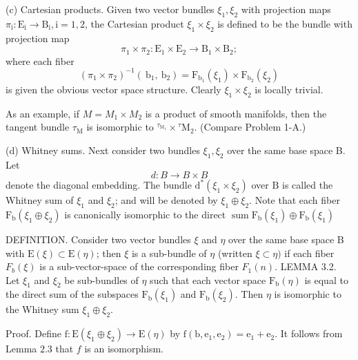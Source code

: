 \documentclass[10pt]{article}
\begin{document}
(c) Cartesian products. Given two vector bundles $\xi_{1}, \xi_{2}$ with projection maps $\pi_{\mathrm{i}}: \mathrm{E}_{\mathrm{i}} \rightarrow \mathrm{B}_{\mathrm{i}}, \mathrm{i}=1,2$, the Cartesian product $\xi_{1} \times \xi_{2}$ is defined to be the bundle with projection map
$$
\pi_{1} \times \pi_{2}: \mathrm{E}_{1} \times \mathrm{E}_{2} \rightarrow \mathrm{B}_{1} \times \mathrm{B}_{2} ;
$$
where each fiber
$$
\left(\pi_{1} \times \pi_{2}\right)^{-1}\left(\mathrm{~b}_{1}, \mathrm{~b}_{2}\right)=\mathrm{F}_{\mathrm{b}_{1}}\left(\xi_{1}\right) \times \mathrm{F}_{\mathrm{b}_{2}}\left(\xi_{2}\right)
$$
is given the obvious vector space structure. Clearly $\xi_{1} \times \xi_{2}$ is locally trivial.

As an example, if $M=M_{1} \times M_{2}$ is a product of smooth manifolds, then the tangent bundle $\tau_{\mathrm{M}}$ is isomorphic to ${ }^{\tau_{\mathrm{M}_{1}}} \times{ }^{\tau} \mathrm{M}_{2}$. (Compare Problem 1-A.)

(d) Whitney sums. Next consider two bundles $\xi_{1}, \xi_{2}$ over the same base space B. Let
$$
d: B \rightarrow B \times B
$$
denote the diagonal embedding. The bundle $\mathrm{d}^{*}\left(\xi_{1} \times \xi_{2}\right)$ over $\mathrm{B}$ is called the Whitney sum of $\xi_{1}$ and $\xi_{2}$; and will be denoted by $\xi_{1} \oplus \xi_{2}$. Note that each fiber $\mathrm{F}_{\mathrm{b}}\left(\xi_{1} \oplus \xi_{2}\right)$ is canonically isomorphic to the direct $\operatorname{sum} \mathrm{F}_{\mathrm{b}}\left(\xi_{1}\right) \oplus \mathrm{F}_{\mathrm{b}}\left(\xi_{1}\right)$

DEFINITION. Consider two vector bundles $\xi$ and $\eta$ over the same base space B with $\mathrm{E}(\xi) \subset \mathrm{E}(\eta)$; then $\xi$ is a sub-bundle of $\eta$ (written $\xi \subset \eta)$ if each fiber $F_{b}(\xi)$ is a sub-vector-space of the corresponding fiber $F_{1}(n)$. LEMMA 3.2. Let $\xi_{1}$ and $\xi_{2}$ be sub-bundles of $\eta$ such that each vector space $\mathrm{F}_{\mathrm{b}}(\eta)$ is equal to the direct sum of the subspaces $\mathrm{F}_{\mathrm{b}}\left(\xi_{1}\right)$ and $\mathrm{F}_{\mathrm{b}}\left(\xi_{2}\right)$. Then $\eta$ is isomorphic to the Whitney sum $\xi_{1} \oplus \xi_{2}$.

Proof. Define $\mathrm{f}: \mathrm{E}\left(\xi_{1} \oplus \xi_{2}\right) \rightarrow \mathrm{E}(\eta)$ by $\mathrm{f}\left(\mathrm{b}, \mathrm{e}_{1}, \mathrm{e}_{2}\right)=\mathrm{e}_{1}+\mathrm{e}_{2}$. It follows from Lemma $2.3$ that $f$ is an isomorphism.
\end{document}
